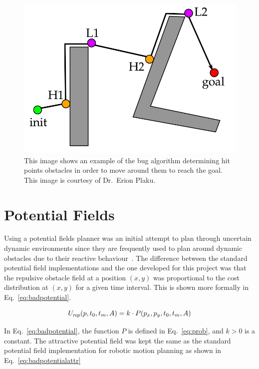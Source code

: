 \begin{figure}[h!]

    \centering

    \includegraphics[width=0.7\linewidth]{figs/bug}

    \caption{This image shows an example of the bug algorithm determining hit
    points obstacles in order to move around them to reach the goal. This image
is courtesy of Dr.\ Erion Plaku.}

    \label{fig:bug}

\end{figure}

\section{Potential Fields}

\label{sec:costpf}

Using a potential fields planner was an initial attempt to plan through
uncertain dynamic environments since they are frequently used to plan around
dynamic obstacles due to their reactive behaviour~\cite{pf, wallar_taros_2013,
wallar_ssci_2014_boids}.  The difference between the standard potential field
implementations and the one developed for this project was that the repulsive
obstacle field at a position $(x, y)$ was proportional to the cost distribution
at $(x, y)$ for a given time interval.  This is shown more formally in
Eq.~\ref{eq:badpotential}.

\begin{equation}
    U_{\Var{rep}}(p, t_0, t_m, A) = k \cdot P(p_x, p_y, t_0, t_m, A)
    \label{eq:badpotential}
\end{equation}

In Eq.~\ref{eq:badpotential}, the function $P$ is defined in Eq.~\ref{eq:prob},
and $k > 0$ is a constant.  The attractive potential field was kept the same as
the standard potential field implementation for robotic motion planning as
shown in Eq.~\ref{eq:badpotentialattr}

